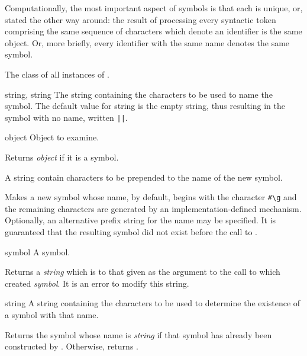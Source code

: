 \begin{optDefinition}
Computationally, the most important aspect of symbols is that each is
unique, or, stated the other way around: the result of processing
every syntactic token comprising the same sequence of characters which
denote an identifier is the same object.  Or, more briefly, every
identifier with the same name denotes the same symbol.

%
The class of all instances of .
%
\begin{initoptions}
    \item[string, string] The string containing the characters to be used to
    name the symbol.  The default value for string is the empty string, thus
    resulting in the symbol with no name, written \verb+||+.
\end{initoptions}

%
\begin{arguments}
    \item[object] Object to examine.
\end{arguments}
%
\result%
Returns {\em object\/} if it is a symbol.

%
\begin{arguments}
%
    \item[\optional{string}] A string contain characters to be prepended
    to the name of the new symbol.
\end{arguments}
%
\result%
Makes a new symbol whose name, by default, begins with the character \verb+#\g+
and the remaining characters are generated by an implementation-defined
mechanism.
Optionally, an alternative prefix string for the name may be specified.  It is
guaranteed that the resulting symbol did not exist before the call to
.

%
\begin{arguments}
    \item[symbol] A symbol.
\end{arguments}
%
\result%
Returns a {\em string\/} which is  to that given as the
argument to the call to  which created {\em symbol}.  It is an
error to modify this string.

%
\begin{arguments}
    \item[string] A string containing the characters to be used to determine the
    existence of a symbol with that name.
\end{arguments}
%
\result%
Returns the symbol whose name is {\em string\/} if that symbol has
already been constructed by .  Otherwise, returns \nil{}.


\end{optDefinition}
